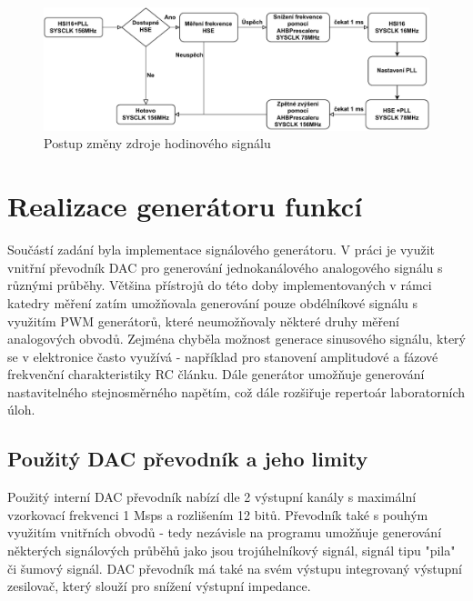 \begin{figure}[H]
	\centering
	\includegraphics[width=1\linewidth]{Figs/Documentation/HSE_Konfigurace}
	\caption{Postup změny zdroje hodinového signálu}
	\label{fig:hsekonfigurace}
\end{figure}



\section{Realizace generátoru funkcí}
Součástí zadání byla implementace signálového generátoru. V práci je využit vnitřní převodník DAC pro generování jednokanálového analogového signálu s různými průběhy. Většina přístrojů do této doby implementovaných v rámci katedry měření zatím umožňovala generování pouze obdélníkové signálu s využitím PWM generátorů, které neumožňovaly některé druhy měření analogových obvodů. Zejména chyběla možnost generace sinusového signálu, který se v elektronice často využívá - například pro stanovení amplitudové a fázové frekvenční charakteristiky  RC článku. Dále generátor umožňuje generování nastavitelného stejnosměrného napětím, což dále rozšiřuje repertoár laboratorních úloh.

\subsection{Použitý DAC převodník a jeho limity}
Použitý interní DAC převodník nabízí dle \cite{dataG431} 2 výstupní kanály s maximální vzorkovací frekvenci 1 Msps a rozlišením 12 bitů. Převodník také s pouhým využitím vnitřních obvodů - tedy nezávisle na programu umožňuje generování některých signálových průběhů jako jsou trojúhelníkový signál, signál tipu "pila" či šumový signál. DAC převodník má také na svém výstupu integrovaný výstupní zesilovač, který slouží pro snížení výstupní impedance. 

